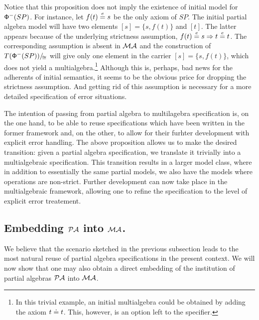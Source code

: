 \documentclass[10pt]{article}
\begin{document}
%
Notice that this proposition does not imply the existence of initial model
for ${\sf {\Phi}}^-(SP)$. For instance, let $f(t)\stackrel{e}{=} s$ be the only axiom of
$SP$. The initial partial algebra model will have two elements
$[s]=\{s,f(t)\}$ and $[t]$. The latter appears because of the underlying
strictness assumption, $f(t)\stackrel{e}{=} s\Rightarrow t\stackrel{e}{=} t$. The corresponding assumption
is absent in ${\mathcal{MA}}$ and the construction of $T({\sf {\Phi}}^-(SP))/\!_{\cong}$
will give only one element in the carrier $[s]=\{s,f(t)\}$, which does not yield a
multialgebra.\footnote{In this trivial example, an initial multialgebra could
be obtained by adding the axiom $t\mathrel{\dot{=} } t$. This, however, is an option left
to the specifier.} Although this is, perhaps, bad news for the adherents of
initial semantics, it seems to be the obvious price for dropping the
strictness assumption. And getting rid of this assumption is necessary for a
more detailed specification of error situations.

The intention of passing from partial algebra to multilagebra specification
is, on the one hand, to be able to reuse specifications which have been written in the former
framework and, on the other, to allow for their furhter development with
explicit error handling.
The above proposition allows us to make the desired
transition: given a partial algebra
specification, we translate it trivially  into a multialgebraic
specification. This transition results in a larger model class, where in
addition to essentially the same partial models, we also have the models
where operations are non-strict.
Further development can now take
place in the multialgebraic framework, allowing one to refine the
specification to the level of explicit error treatement.
%
\subsection{Embedding ${\mathcal{PA}}$ into ${\mathcal{MA}}$.}\label{sub:emb}
We believe that the scenario sketched in the previous subsection leads to
the most natural reuse of partial algebra specifications in the present
context. We will now show that one may also obtain a direct embedding of the
institution of partial algebras ${\mathcal{PA}}$ into ${\mathcal{MA}}$.
\end{document}
